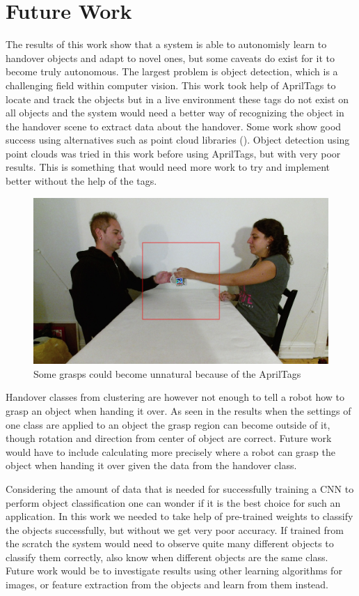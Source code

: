 \section{Future Work}
\label{sec:future-work}

The results of this work show that a system is able to autonomisly learn to handover objects and adapt to novel ones, but some caveats do exist for it to become truly autonomous. The largest problem is object detection, which is a challenging field within computer vision. This work took help of AprilTags to locate and track the objects but in a live environment these tags do not exist on all objects and the system would need a better way of recognizing the object in the handover scene to extract data about the handover. Some work show good success using alternatives such as point cloud libraries (\parencite{Chan2015a}). Object detection using point clouds was tried in this work before using AprilTags, but with very poor results. This is something that would need more work to try and implement better without the help of the tags.

\begin{figure}
	\centering
	\includegraphics[width=\textwidth]{img/conclusion/awkward_handover_frame.jpg}
	\caption{Some grasps could become unnatural because of the AprilTags}
	\label{fig:fw_handover_awkward}
\end{figure}

Handover classes from clustering are however not enough to tell a robot how to grasp an object when handing it over. As seen in the results when the settings of one class are applied to an object the grasp region can become outside of it, though rotation and direction from center of object are correct. Future work would have to include calculating more precisely where a robot can grasp the object when handing it over given the data from the handover class.

Considering the amount of data that is needed for successfully training a CNN to perform object classification one can wonder if it is the best choice for such an application. In this work we needed to take help of pre-trained weights to classify the objects successfully, but without we get very poor accuracy. If trained from the scratch the system would need to observe quite many different objects to classify them correctly, also know when different objects are the same class. Future work would be to investigate results using other learning algorithms for images, or feature extraction from the objects and learn from them instead.
